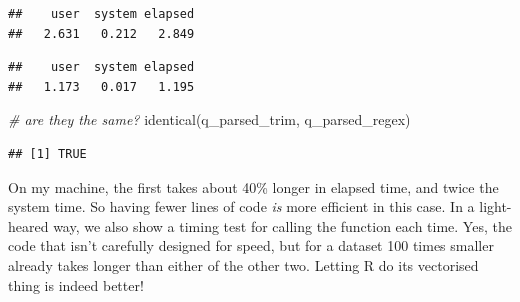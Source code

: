 \documentclass[
]{book}
\newenvironment{Shaded}{\begin{snugshade}}{\end{snugshade}}
\newcommand{\AttributeTok}[1]{\textcolor[rgb]{0.77,0.63,0.00}{#1}}
\newcommand{\CommentTok}[1]{\textcolor[rgb]{0.56,0.35,0.01}{\textit{#1}}}
\newcommand{\ControlFlowTok}[1]{\textcolor[rgb]{0.13,0.29,0.53}{\textbf{#1}}}
\newcommand{\DecValTok}[1]{\textcolor[rgb]{0.00,0.00,0.81}{#1}}
\newcommand{\FunctionTok}[1]{\textcolor[rgb]{0.00,0.00,0.00}{#1}}
\newcommand{\NormalTok}[1]{#1}
\newcommand{\OtherTok}[1]{\textcolor[rgb]{0.56,0.35,0.01}{#1}}
\newcommand{\SpecialCharTok}[1]{\textcolor[rgb]{0.00,0.00,0.00}{#1}}
\newcommand{\StringTok}[1]{\textcolor[rgb]{0.31,0.60,0.02}{#1}}
\begin{document}
\begin{verbatim}
##    user  system elapsed 
##   2.631   0.212   2.849
\end{verbatim}

\begin{Shaded}
\end{Shaded}

\begin{verbatim}
##    user  system elapsed 
##   1.173   0.017   1.195
\end{verbatim}

\begin{Shaded}
\begin{Highlighting}[]
\CommentTok{\# are they the same?}
\FunctionTok{identical}\NormalTok{(q\_parsed\_trim, q\_parsed\_regex)}
\end{Highlighting}
\end{Shaded}

\begin{verbatim}
## [1] TRUE
\end{verbatim}

On my machine, the first takes about 40\% longer in elapsed time, and twice the system time. So having fewer lines of code \emph{is} more efficient in this case. In a light-heared way, we also show a timing test for calling the function each time. Yes, the code that isn't carefully designed for speed, but for a dataset 100 times smaller already takes longer than either of the other two. Letting R do its vectorised thing is indeed better!
\end{document}
